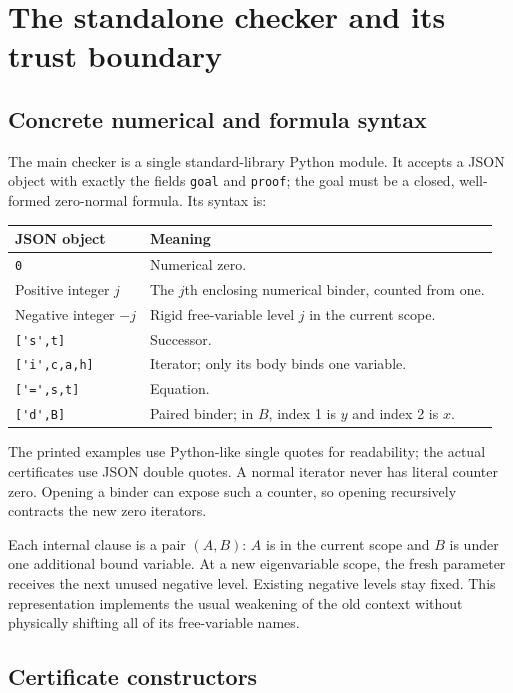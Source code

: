\documentclass[11pt,letterpaper]{article}
\newcommand{\file}[1]{\nolinkurl{#1}}
\begin{document}
\section{The standalone checker and its trust boundary}

\subsection{Concrete numerical and formula syntax}

The main checker is a single standard-library Python module. It accepts a
JSON object with exactly the fields \file{goal} and \file{proof}; the goal
must be a closed, well-formed zero-normal formula. Its syntax is:
\begin{center}
\begin{tabularx}{\linewidth}{@{}lX@{}}
\toprule
JSON object & Meaning\\
\midrule
\file{0} & Numerical zero.\\
Positive integer $j$ & The $j$th enclosing numerical binder, counted from one.\\
Negative integer $-j$ & Rigid free-variable level $j$ in the current scope.\\
\file{['s',t]} & Successor.\\
\file{['i',c,a,h]} & Iterator; only its body binds one variable.\\
\file{['=',s,t]} & Equation.\\
\file{['d',B]} & Paired binder; in $B$, index 1 is $y$ and index 2 is $x$.\\
\bottomrule
\end{tabularx}
\end{center}
The printed examples use Python-like single quotes for readability; the
actual certificates use JSON double quotes. A normal iterator never has
literal counter zero. Opening a binder can expose such a counter, so
opening recursively contracts the new zero iterators.

Each internal clause is a pair $(A,B)$: $A$ is in the current scope and
$B$ is under one additional bound variable. At a new eigenvariable scope,
the fresh parameter receives the next unused negative level. Existing
negative levels stay fixed. This representation implements the usual
weakening of the old context without physically shifting all of its
free-variable names.

\subsection{Certificate constructors}
\end{document}
